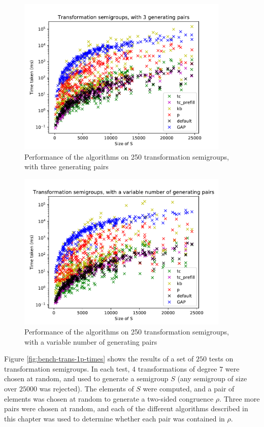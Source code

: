 \begin{figure}[p]
  \centering
  \includegraphics[width=0.9\textwidth]{pics/ch-pairs/bench-trans-3p-times}
  \caption[Benchmark: all algorithms, concrete, 3 pairs]
  {Performance of the algorithms on 250 transformation semigroups, with
    three generating pairs}
  \label{fig:bench-trans-3p-times}
\end{figure}

\begin{figure}[p]
  \centering
  \includegraphics[width=0.9\textwidth]{pics/ch-pairs/bench-trans-vp-times}
  \caption[Benchmark: all algorithms, concrete, $n$ pairs]
  {Performance of the algorithms on 250 transformation semigroups, with
    a variable number of generating pairs}
  \label{fig:bench-trans-vp-times}
\end{figure}

Figure \ref{fig:bench-trans-1p-times} shows the results of a set of $250$ tests
on transformation semigroups.  In each test, $4$ transformations of degree $7$
were chosen at random, and used to generate a semigroup $S$ (any semigroup of
size over $25000$ was rejected).  The elements of $S$ were computed, and a pair
of elements was chosen at random to generate a two-sided congruence $\rho$.  Three more
pairs were chosen at random, and each of the different algorithms described in
this chapter was used to determine whether each pair was contained in $\rho$.

